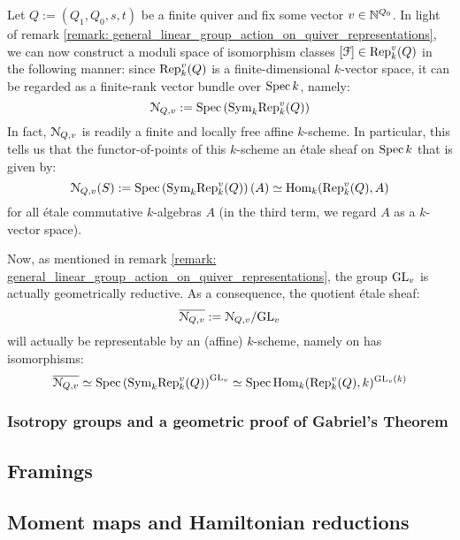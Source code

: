             \begin{remark} \label{remark: moduli_spaces_of_quiver_representations_of_given_dimensions} 
                Let $Q := (Q_1, Q_0, s, t)$ be a finite quiver and fix some vector $v \in \mathbb{N}^{Q_0}$. In light of remark \ref{remark: general_linear_group_action_on_quiver_representations}, we can now construct a moduli space of isomorphism classes $[\mathcal{F}] \in \mathrm{Rep}_k^v(Q)$ in the following manner: since $\mathrm{Rep}_k^v(Q)$ is a finite-dimensional $k$-vector space, it can be regarded as a finite-rank vector bundle over $\operatorname{Spec} k$, namely:
                    $$\mathcal{N}_{Q, v} := \operatorname{Spec}\left( \mathrm{Sym}_k \mathrm{Rep}_k^v(Q) \right)$$
                In fact, $\mathcal{N}_{Q, v}$ is readily a finite and locally free affine $k$-scheme. In particular, this tells us that the functor-of-points of this $k$-scheme an \'etale sheaf on $\operatorname{Spec} k$ that is given by:
                    $$\mathcal{N}_{Q, v}(S) := \operatorname{Spec}\left( \mathrm{Sym}_k \mathrm{Rep}_k^v(Q) \right)(A) \simeq \mathrm{Hom}_k(\mathrm{Rep}_k^v(Q), A)$$
                for all \'etale commutative $k$-algebras $A$ (in the third term, we regard $A$ as a $k$-vector space).
                
                Now, as mentioned in remark \ref{remark: general_linear_group_action_on_quiver_representations}, the group $\mathrm{GL}_v$ is actually geometrically reductive. As a consequence, the quotient \'etale sheaf:
                    $$\overline{\mathcal{N}_{Q, v}} := \mathcal{N}_{Q, v}/\mathrm{GL}_v$$
                will actually be representable by an (affine) $k$-scheme, namely on has isomorphisms:
                    $$\overline{\mathcal{N}_{Q, v}} \simeq \operatorname{Spec}\left( \mathrm{Sym}_k \mathrm{Rep}_k^v(Q) \right)^{\mathrm{GL}_v} \simeq \operatorname{Spec} \mathrm{Hom}_k(\mathrm{Rep}_k^v(Q), k)^{\mathrm{GL}_v(k)}$$
            \end{remark}
            
        \subsubsection{Isotropy groups and a geometric proof of Gabriel's Theorem}
            
    
    \subsection{Framings}
    
    \subsection{Moment maps and Hamiltonian reductions}